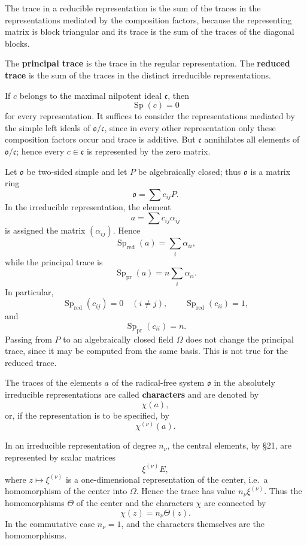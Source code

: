 \documentclass[11pt]{article}
\begin{document}
The trace in a reducible representation is the sum of the traces in the
representations mediated by the composition factors, because the
representing matrix is block triangular and its trace is the sum of the
traces of the diagonal blocks.

The \textbf{principal trace} is the trace in the regular representation.
The \textbf{reduced trace} is the sum of the traces in the distinct
irreducible representations.

If \(c\) belongs to the maximal nilpotent ideal \(\mathfrak c\), then \[
  \operatorname{Sp}(c)=0
\] for every representation. It suffices to consider the representations
mediated by the simple left ideals of \(\mathfrak{o}/\mathfrak c\),
since in every other representation only these composition factors occur
and trace is additive. But \(\mathfrak c\) annihilates all elements of
\(\mathfrak{o}/\mathfrak c\); hence every \(c\in\mathfrak c\) is
represented by the zero matrix.

Let \(\mathfrak{o}\) be two-sided simple and let \(P\) be algebraically
closed; thus \(\mathfrak{o}\) is a matrix ring \[
  \mathfrak{o}=\sum c_{ij}P.
\] In the irreducible representation, the element \[
  a=\sum c_{ij}\alpha_{ij}
\] is assigned the matrix \((\alpha_{ij})\). Hence \[
  \operatorname{Sp}_{\mathrm{red}}(a)=\sum_i\alpha_{ii},
\] while the principal trace is \[
  \operatorname{Sp}_{\mathrm{pr}}(a)=n\sum_i\alpha_{ii}.
\] In particular, \[
  \operatorname{Sp}_{\mathrm{red}}(c_{ij})=0\quad(i\ne j),
  \qquad
  \operatorname{Sp}_{\mathrm{red}}(c_{ii})=1,
\] and \[
  \operatorname{Sp}_{\mathrm{pr}}(c_{ii})=n.
\] Passing from \(P\) to an algebraically closed field \(\Omega\) does
not change the principal trace, since it may be computed from the same
basis. This is not true for the reduced trace.

The traces of the elements \(a\) of the radical-free system
\(\mathfrak{o}\) in the absolutely irreducible representations are
called \textbf{characters} and are denoted by \[
  \chi(a),
\] or, if the representation is to be specified, by \[
  \chi^{(\nu)}(a).
\]

In an irreducible representation of degree \(n_\nu\), the central
elements, by §21, are represented by scalar matrices \[
  \xi^{(\nu)}E,
\] where \(z\mapsto \xi^{(\nu)}\) is a one-dimensional representation of
the center, i.e.~a homomorphism of the center into \(\Omega\). Hence the
trace has value \(n_\nu\xi^{(\nu)}\). Thus the homomorphisms \(\Theta\)
of the center and the characters \(\chi\) are connected by \[
  \chi(z)=n_\nu\Theta(z).
\] In the commutative case \(n_\nu=1\), and the characters themselves
are the homomorphisms.
\end{document}
